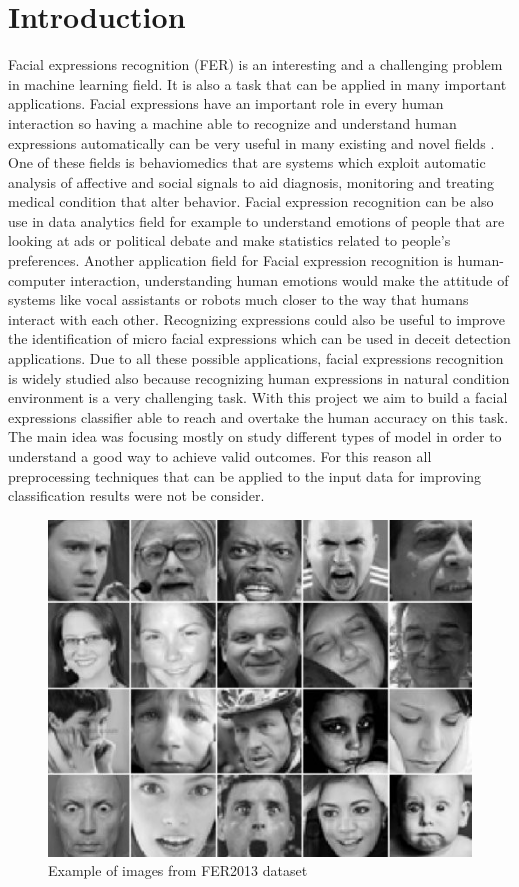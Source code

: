 \documentclass[10pt,twocolumn,letterpaper]{article}
\begin{document}
\section{Introduction}
Facial expressions recognition (FER) is an interesting and a challenging problem
in machine learning field. It is also a task that can be applied in many important applications.
Facial expressions have an important role in every human interaction so having a machine able to
recognize and understand human expressions automatically can be very useful
in many existing and novel fields \cite{2}.
\\One of these fields is behaviomedics that are systems which exploit automatic analysis of affective and social signals
to aid diagnosis, monitoring and treating medical condition that alter behavior.
Facial expression recognition can be also use in data analytics field for example to understand
emotions of people that are looking at ads or political debate and make statistics related to people's preferences.
Another application field for Facial expression recognition is human-computer interaction, understanding human emotions
would make the attitude of systems like vocal assistants or robots much closer to the way that humans interact with each other.
Recognizing expressions could also be useful to improve the identification of micro facial expressions which can be used in
deceit detection applications.
Due to all these possible applications, facial expressions recognition is widely studied also because recognizing
human expressions in natural condition environment is a very challenging task.
With this project we aim to build a facial expressions classifier able to reach and overtake the human accuracy on this task.
The main idea was focusing mostly on study different types of model in order to understand a good way to achieve valid outcomes.
For this reason all preprocessing techniques that can be applied to the input data for improving classification results were not be consider.
\begin{figure}[H]
   \centering
   \includegraphics[width=0.8\linewidth]{./immagini/dataset.jpeg}
   \caption{Example of images from FER2013 dataset}
\end{figure}
\end{document}
